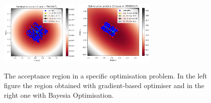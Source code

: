 
\begin{figure}[h]
    \begin{center}
      \includegraphics[width=0.35\textwidth]{./latex_files/images/chapter4/ma2_region_3.png}
      \includegraphics[width=0.35\textwidth]{./latex_files/images/chapter4/ma2_region_3_bo.png}
    \end{center}
  \caption[The acceptance region of a specific deterministic simulator.]{The acceptance region in a specific optimisation problem. In the left figure the region obtained with gradient-based optimiser and in the right one with Bayesia Optimisation.}
  \label{fig:ma2_5}
\end{figure}


